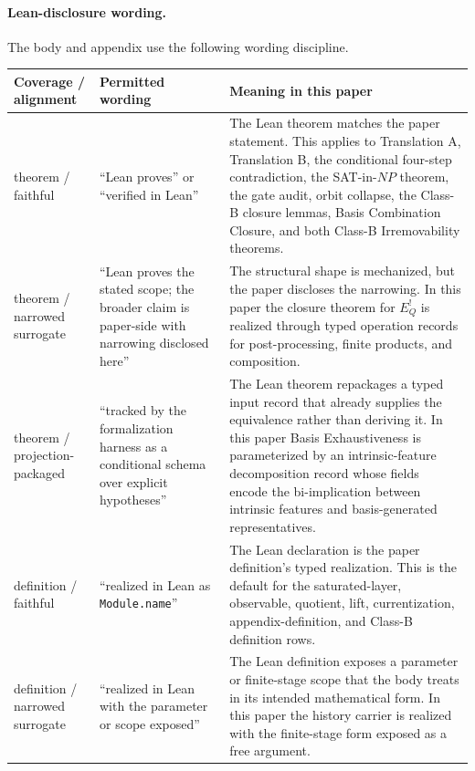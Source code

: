 \documentclass[11pt]{article}
\newcommand{\EQbang}{E^{!}_{Q}}
\theoremstyle{definition}
\begin{document}
\paragraph{Lean-disclosure wording.}
The body and appendix use the following wording discipline.
\begin{center}
\small
\begin{tabularx}{\textwidth}{@{}>{\raggedright\arraybackslash}p{}>{\raggedright\arraybackslash}p{}>{\raggedright\arraybackslash}X@{}}
\toprule
Coverage / alignment & Permitted wording & Meaning in this paper \\
\midrule
theorem / faithful &
``Lean proves'' or ``verified in Lean'' &
The Lean theorem matches the paper statement.  This applies to
Translation A, Translation B, the conditional four-step contradiction,
the SAT-in-\(NP\) theorem, the gate audit, orbit collapse, the Class-B
closure lemmas, Basis Combination Closure, and both Class-B
Irremovability theorems. \\

theorem / narrowed surrogate &
``Lean proves the stated scope; the broader claim is paper-side with
narrowing disclosed here'' &
The structural shape is mechanized, but the paper discloses the
narrowing.  In this paper the closure theorem for \(\EQbang\) is
realized through typed operation records for post-processing, finite
products, and composition. \\

theorem / projection-packaged &
``tracked by the formalization harness as a conditional schema over
explicit hypotheses'' &
The Lean theorem repackages a typed input record that already supplies
the equivalence rather than deriving it.  In this paper Basis
Exhaustiveness is parameterized by an intrinsic-feature decomposition
record whose fields encode the bi-implication between intrinsic
features and basis-generated representatives. \\

definition / faithful &
``realized in Lean as \texttt{Module.name}'' &
The Lean declaration is the paper definition's typed realization.  This
is the default for the saturated-layer, observable, quotient, lift,
currentization, appendix-definition, and Class-B definition rows. \\

definition / narrowed surrogate &
``realized in Lean with the parameter or scope exposed'' &
The Lean definition exposes a parameter or finite-stage scope that the
body treats in its intended mathematical form.  In this paper the
history carrier is realized with the finite-stage form exposed as a
free argument. \\


\end{tabularx}
\end{center}
\end{document}

